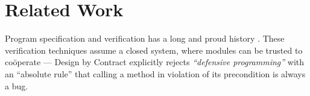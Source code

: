 \section{Related Work}
\label{s:related}




Program specification and verification has a long and proud history
\cite{Hoare69,behavSurvey2012,Leavens-etal07,dafny,whiley15,usingHistory,Considerate}.
These verification techniques assume a closed system, where modules can be trusted
to co{\"o}perate ---  Design by Contract \cite{MeyerDBC92} explicitly
rejects \textit{``defensive programming''}  with an ``absolute rule''
that calling a method in violation of its precondition is always a
bug.

%



